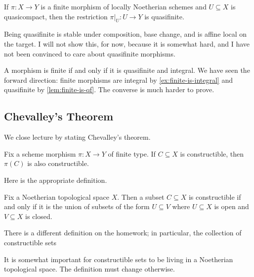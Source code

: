 \documentclass[../notes.tex]{subfiles}
\begin{document}
\begin{example}
	If $\pi\colon X\to Y$ is a finite morphism of locally Noetherian schemes and $U\subseteq X$ is quasicompact, then the restriction $\pi|_U\colon U\to Y$ is quasifinite.
\end{example}
\begin{remark}
	Being quasifinite is stable under composition, base change, and is affine local on the target. I will not show this, for now, because it is somewhat hard, and I have not been convinced to care about quasifinite morphisms.
\end{remark}
\begin{remark}
	A morphism is finite if and only if it is quasifinite and integral. We have seen the forward direction: finite morphisms are integral by \autoref{ex:finite-is-integral} and quasifinite by \autoref{lem:finite-is-qf}. The converse is much harder to prove.
\end{remark}

\subsection{Chevalley's Theorem}
We close lecture by stating Chevalley's theorem.
\begin{theorem}[Chevalley]
	Fix a scheme morphism $\pi\colon X\to Y$ of finite type. If $C\subseteq X$ is constructible, then $\pi(C)$ is also constructible.
\end{theorem}
Here is the appropriate definition.
\begin{definition}[Constructible]
	Fix a Noetherian topological space $X$. Then a subset $C\subseteq X$ is constructible if and only if it is the union of subsets of the form $U\subseteq V$ where $U\subseteq X$ is open and $V\subseteq X$ is closed.
\end{definition}
There is a different definition on the homework; in particular, the collection of constructible sets
\begin{remark}
	It is somewhat important for constructible sets to be living in a Noetherian topological space. The definition must change otherwise.
\end{remark}
\end{document}
